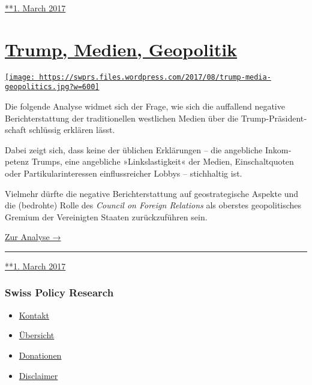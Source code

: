 \href{https://swprs.org/2017/03/01/propaganda-matrix/}{**1. March 2017}

\hypertarget{trump-medien-geopolitik}{%
\section{\texorpdfstring{\href{https://swprs.org/2017/03/01/trump-medien-geopolitik/}{Trump,
Medien,
Geopolitik}}{Trump, Medien, Geopolitik}}\label{trump-medien-geopolitik}}

\href{https://swprs.org/2017/03/01/trump-medien-geopolitik/}{\texttt{[image: https://swprs.files.wordpress.com/2017/08/trump-media-geopolitics.jpg?w=600]}}

Die folgende Analyse widmet sich der Frage, wie sich die auf­fallend
negative Bericht­er­stattung der tra­di­tio­nellen west­lichen Medien
über die Trump-Prä­si­dent­schaft schlüssig er­klären lässt.

Dabei zeigt sich, dass keine der übli­chen Er­klä­rungen -- die
angeb­liche In­kom­petenz Trumps, eine an­geb­liche »Links­las­tig­keit«
der Medien, Ein­schalt­quoten oder Par­ti­ku­lar­inte­ressen
ein­fluss­reicher Lobbys -- stich­haltig ist.

Vielmehr dürfte die negative Bericht­erstattung auf geostra­tegische
Aspekte und die (bedrohte) Rolle des \emph{Council on Foreign Relations}
als oberstes geopolitisches Gremium der Vereinigten Staaten
zurück­­zu­führen sein.

\href{https://swprs.org/trump-medien-geopolitik/}{Zur Analyse →}

\begin{center}\rule{0.5\linewidth}{\linethickness}\end{center}

\href{https://swprs.org/2017/03/01/trump-medien-geopolitik/}{**1. March
2017}

\hypertarget{swiss-policy-research}{%
\subsubsection{Swiss Policy Research}\label{swiss-policy-research}}

\begin{itemize}
\tightlist
\item
  \href{https://swprs.org/kontakt/}{Kontakt}
\item
  \href{https://swprs.org/uebersicht/}{Übersicht}
\item
  \href{https://swprs.org/donationen/}{Donationen}
\item
  \href{https://swprs.org/disclaimer/}{Disclaimer}
\end{itemize}

